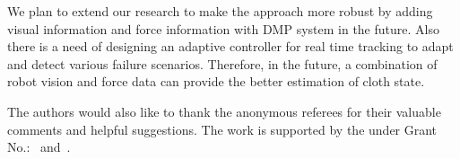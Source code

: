\documentclass[sigconf]{acmart}
\begin{document}
We plan to extend our research to make the approach more robust by adding visual information and force information with DMP system in the future. Also there is a need of designing an adaptive controller for real time tracking to adapt and detect various failure scenarios. Therefore, in the future, a combination of robot vision and force data can provide the better estimation of cloth state.

\begin{acks}
	The authors would also like to thank the anonymous referees for their valuable comments and helpful suggestions. The work is supported by the  under Grant No.:~ and~.
\end{acks}


%

\end{document}
